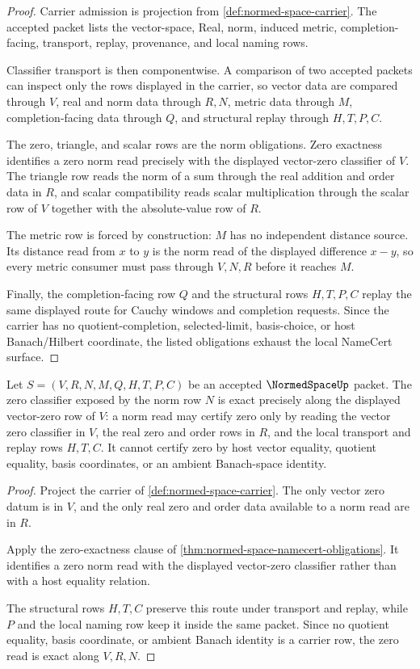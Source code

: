 \begin{proof}
Carrier admission is projection from \autoref{def:normed-space-carrier}. The accepted packet lists the vector-space, Real, norm, induced metric, completion-facing, transport, replay, provenance, and local naming rows.

Classifier transport is then componentwise. A comparison of two accepted packets can inspect only the rows displayed in the carrier, so vector data are compared through $V$, real and norm data through $R,N$, metric data through $M$, completion-facing data through $Q$, and structural replay through $H,T,P,C$.

The zero, triangle, and scalar rows are the norm obligations. Zero exactness identifies a zero norm read precisely with the displayed vector-zero classifier of $V$. The triangle row reads the norm of a sum through the real addition and order data in $R$, and scalar compatibility reads scalar multiplication through the scalar row of $V$ together with the absolute-value row of $R$.

The metric row is forced by construction: $M$ has no independent distance source. Its distance read from $x$ to $y$ is the norm read of the displayed difference $x-y$, so every metric consumer must pass through $V,N,R$ before it reaches $M$.

Finally, the completion-facing row $Q$ and the structural rows $H,T,P,C$ replay the same displayed route for Cauchy windows and completion requests. Since the carrier has no quotient-completion, selected-limit, basis-choice, or host Banach/Hilbert coordinate, the listed obligations exhaust the local NameCert surface.
\end{proof}

\begin{theorem}
\label{thm:normed-space-zero-exactness}
Let $S=(V,R,N,M,Q,H,T,P,C)$ be an accepted $\NormedSpaceUp$ packet. The zero classifier exposed by the norm row $N$ is exact precisely along the displayed vector-zero row of $V$: a norm read may certify zero only by reading the vector zero classifier in $V$, the real zero and order rows in $R$, and the local transport and replay rows $H,T,C$. It cannot certify zero by host vector equality, quotient equality, basis coordinates, or an ambient Banach-space identity.
\end{theorem}
\begin{proof}
Project the carrier of \autoref{def:normed-space-carrier}. The only vector zero datum is in $V$, and the only real zero and order data available to a norm read are in $R$.

Apply the zero-exactness clause of \autoref{thm:normed-space-namecert-obligations}. It identifies a zero norm read with the displayed vector-zero classifier rather than with a host equality relation.

The structural rows $H,T,C$ preserve this route under transport and replay, while $P$ and the local naming row keep it inside the same packet. Since no quotient equality, basis coordinate, or ambient Banach identity is a carrier row, the zero read is exact along $V,R,N$.
\end{proof}

